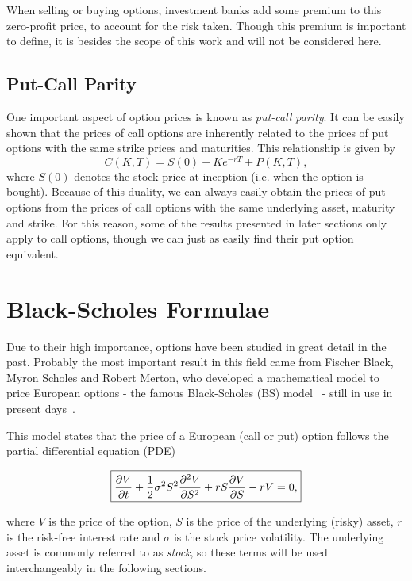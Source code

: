 When selling or buying options, investment banks add some premium to this zero-profit price, to account for the risk taken. Though this premium is important to define, it is besides the scope of this work and will not be considered here.

\subsection{Put-Call Parity}
One important aspect of option prices is known as \emph{put-call parity}. It can be easily shown that the prices of call options are inherently related to the prices of put options with the same strike prices and maturities. This relationship is given by
\begin{equation}
C(K,T)=S(0)-Ke^{-rT}+P(K,T),
\end{equation}
\noindent where $S(0)$ denotes the stock price at inception (i.e. when the option is bought).
Because of this duality, we can always easily obtain the prices of put options from the prices of call options with the same underlying asset, maturity and strike. For this reason, some of the results presented in later sections only apply to call options, though we can just as easily find their put option equivalent.
    
\section{Black-Scholes Formulae}
\label{section:Black-Scholes Formulae}
Due to their high importance, options have been studied in great detail in the past.
Probably the most important result in this field came from Fischer Black, Myron Scholes and Robert Merton, who developed a mathematical model to price European options - the famous Black-Scholes (BS) model~\citep{Scholes} - still in use in present days~\citep{Wilmott3}.

This model states that the price of a European (call or put) option follows the partial differential equation (PDE)

\begin{equation}\label{BS2}
\boxed{\pdv{V}{t}+\frac{1}{2}\sigma^2S^2\pdv{^2V}{S^2}+rS\pdv{V}{S}-rV=0,}
\end{equation}

\noindent where $V$ is the price of the option, $S$ is the price of the underlying (risky) asset, $r$ is the risk-free interest rate and $\sigma$ is the stock price volatility.
The underlying asset is commonly referred to as \emph{stock}, so these terms will be used interchangeably in the following sections.

